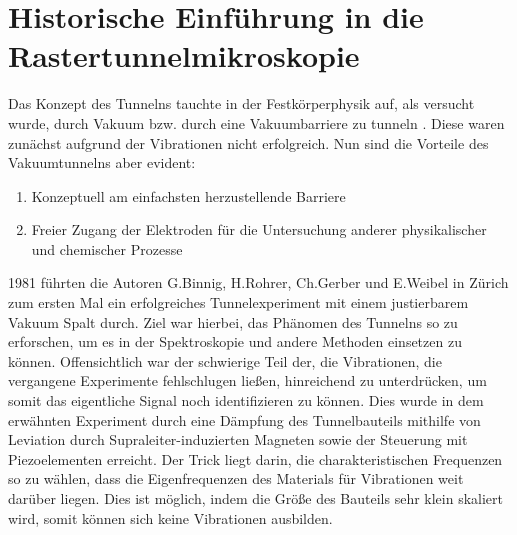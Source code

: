 \section{Historische Einführung in die Rastertunnelmikroskopie}
Das Konzept des Tunnelns tauchte in der 
Festkörperphysik auf, als versucht wurde, durch Vakuum bzw. durch
eine Vakuumbarriere zu tunneln \cite{binnig1982tunneling}. Diese
waren zunächst aufgrund der Vibrationen nicht erfolgreich. Nun sind
die Vorteile des Vakuumtunnelns aber evident:
\begin{enumerate}
\item Konzeptuell am einfachsten herzustellende Barriere 
\item Freier Zugang der Elektroden für die Untersuchung anderer
physikalischer und chemischer Prozesse
\end{enumerate}
1981 führten die Autoren G.Binnig, H.Rohrer,
Ch.Gerber und E.Weibel in Zürich zum ersten Mal ein erfolgreiches
Tunnelexperiment mit einem justierbarem Vakuum Spalt durch. 
Ziel war hierbei, das Phänomen des Tunnelns so zu erforschen,
um es in der Spektroskopie und andere Methoden einsetzen zu können. 
Offensichtlich war der schwierige Teil der, die Vibrationen,
die vergangene Experimente fehlschlugen ließen, hinreichend zu
unterdrücken, um somit das eigentliche Signal noch identifizieren zu
können. Dies wurde in dem erwähnten Experiment durch eine 
Dämpfung des Tunnelbauteils mithilfe von Leviation durch
Supraleiter-induzierten Magneten sowie
der Steuerung mit Piezoelementen erreicht. Der Trick liegt darin,
die charakteristischen Frequenzen so zu wählen, dass die 
Eigenfrequenzen des Materials für Vibrationen weit darüber liegen.
Dies ist möglich, indem die Größe des Bauteils sehr klein
skaliert wird, somit können sich keine Vibrationen ausbilden.

